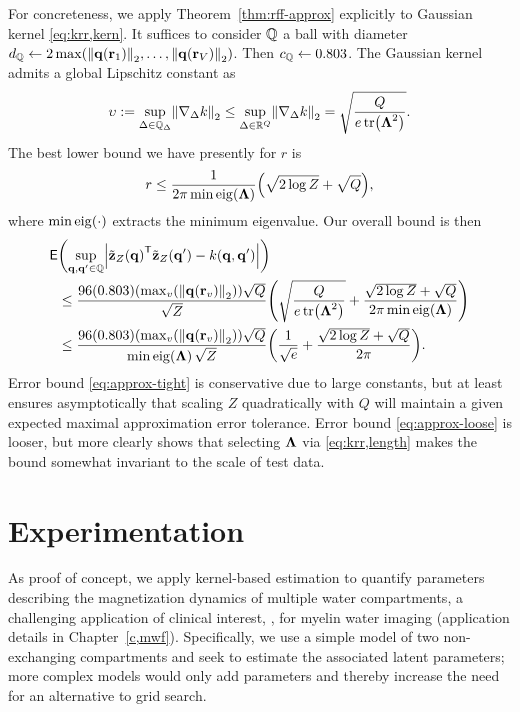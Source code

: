For concreteness,
we apply Theorem~\ref{thm:rff-approx} explicitly 
to Gaussian kernel \eqref{eq:krr,kern}.
It suffices to consider $\mathbb{Q}$ a ball
with diameter 
$d_\setQ \gets 2 
\max\paren{\norm{\bmq\paren{\bmr_1}}_2,\dots,\norm{\bmq\paren{\bmr_V}}_2}$.
Then $c_{\mathbb{Q}} \gets 0.803$.
The Gaussian kernel admits a global Lipschitz constant as
\begin{align}
	\upsilon := \sup_{\Delta \in \setQD} \norm{\grada{\Delta}{k}}_2 
		\leq \sup_{\Delta \in \reals{Q}} \norm{\grada{\Delta}{k}}_2 
		= \sqrt{\frac{Q}{e\trace{\bmL^2}}}.
	\label{eq:krr,lipschitz}
\end{align}
The best lower bound we have presently 
for $r$ is 
\begin{align}
	r \leq \frac{1}{2\pi \mineig{\bmL}} \paren{\sqrt{2 \log{Z}} + \sqrt{Q}},
	\label{eq:krr,max-nu}
\end{align}
where $\mineig{\cdot}$ extracts the minimum eigenvalue.
Our overall bound is then 
\begin{align}
	\mathsf{E}&\paren{\sup_{\bmq,\bmq' \in \setQ} 
		\abs{\bmztZa{\bmq}\tpose\bmztZa{\bmq'}-k\paren{\bmq,\bmq'}}} 
		\nonumber \\
	&\leq 
		\frac{96\paren{0.803}
		\paren{\max_v\paren{\norm{\bmq\paren{\bmr_v}}_2}}\sqrt{Q}}{\sqrt{Z}}
		\paren{\sqrt{\frac{Q}{e\trace{\bmL^2}}} + 
		\frac{\sqrt{2 \log{Z}} + \sqrt{Q}}{2\pi \mineig{\bmL}}}
		\label{eq:approx-tight} \\
	&\leq 
		\frac{96\paren{0.803}
		\paren{\max_v\paren{\norm{\bmq\paren{\bmr_v}}_2}}\sqrt{Q}}{\mineig{\bmL}\sqrt{Z}}
		\paren{\frac{1}{\sqrt{e}} + \frac{\sqrt{2\log{Z}} + \sqrt{Q}}{2\pi}}.
		\label{eq:approx-loose}
\end{align}	
Error bound \eqref{eq:approx-tight} is conservative 
due to large constants,
but at least ensures asymptotically
that scaling $Z$ quadratically 
with $Q$ 
will maintain a given expected maximal approximation error tolerance.
Error bound \eqref{eq:approx-loose} is looser,
but more clearly shows 
that selecting $\boldsymbol{\Lambda}$ 
via \eqref{eq:krr,length}
makes the bound somewhat invariant
to the scale of test data.

\section{Experimentation}
\label{s,krr,exp}

As proof of concept, 
we apply kernel-based estimation 
to quantify parameters describing 
the magnetization dynamics of multiple water compartments,
a challenging application of clinical interest,
\eg, for myelin water imaging 
(application details in Chapter~\ref{c,mwf}).
Specifically,
we use a simple model of two non-exchanging compartments
and seek to estimate the associated latent parameters;
more complex models would only add parameters
and thereby increase the need for an alternative to grid search.

